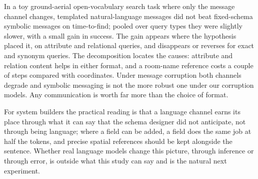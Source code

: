 In a toy ground-aerial open-vocabulary search task where only the message channel changes, templated natural-language messages did not beat fixed-schema symbolic messages on time-to-find; pooled over query types they were slightly slower, with a small gain in success. The gain appears where the hypothesis placed it, on attribute and relational queries, and disappears or reverses for exact and synonym queries. The decomposition locates the causes: attribute and relation content helps in either format, and a room-name reference costs a couple of steps compared with coordinates. Under message corruption both channels degrade and symbolic messaging is not the more robust one under our corruption models. Any communication is worth far more than the choice of format.

For system builders the practical reading is that a language channel earns its place through what it can say that the schema designer did not anticipate, not through being language; where a field can be added, a field does the same job at half the tokens, and precise spatial references should be kept alongside the sentence. Whether real language models change this picture, through inference or through error, is outside what this study can say and is the natural next experiment.
